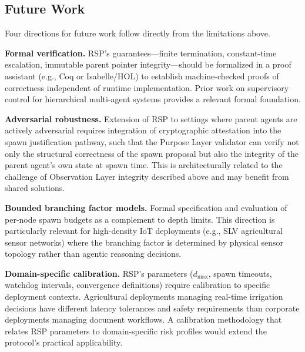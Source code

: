 \subsection{Future Work}
\label{sec:future-work}

Four directions for future work follow directly from the limitations above.

\textbf{Formal verification.} RSP's guarantees---finite termination, constant-time escalation, immutable parent pointer integrity---should be formalized in a proof assistant (e.g., Coq or Isabelle/HOL) to establish machine-checked proofs of correctness independent of runtime implementation. Prior work on supervisory control for hierarchical multi-agent systems provides a relevant formal foundation.\cite{ouhamma2024hmas}

\textbf{Adversarial robustness.} Extension of RSP to settings where parent agents are actively adversarial requires integration of cryptographic attestation into the spawn justification pathway, such that the Purpose Layer validator can verify not only the structural correctness of the spawn proposal but also the integrity of the parent agent's own state at spawn time. This is architecturally related to the challenge of Observation Layer integrity described above and may benefit from shared solutions.

\textbf{Bounded branching factor models.} Formal specification and evaluation of per-node spawn budgets as a complement to depth limits. This direction is particularly relevant for high-density IoT deployments (e.g., SLV agricultural sensor networks) where the branching factor is determined by physical sensor topology rather than agentic reasoning decisions.

\textbf{Domain-specific calibration.} RSP's parameters ($d_{\max}$, spawn timeouts, watchdog intervals, convergence definitions) require calibration to specific deployment contexts. Agricultural deployments managing real-time irrigation decisions have different latency tolerances and safety requirements than corporate deployments managing document workflows. A calibration methodology that relates RSP parameters to domain-specific risk profiles would extend the protocol's practical applicability.


